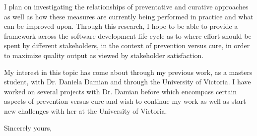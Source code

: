 \documentclass[11pt]{letter} %
\begin{document}
\begin{letter}{}
I plan on investigating the relationships of preventative and curative approaches as well as how these measures are currently being performed in practice and what can be improved upon. Through this research, I hope to be able to provide a framework across the software development life cycle as to where effort should be spent by different stakeholders, in the context of prevention versus cure, in order to maximize quality output as viewed by stakeholder satisfaction.

My interest in this topic has come about through my previous work, as a masters student, with Dr. Daniela Damian and through the University of Victoria. I have worked on several projects with Dr. Damian before which encompass certain aspects of prevention versus cure and wish to continue my work as well as start new challenges with her at the University of Victoria.

\closing{Sincerely yours,}



\end{letter}
\end{document}
